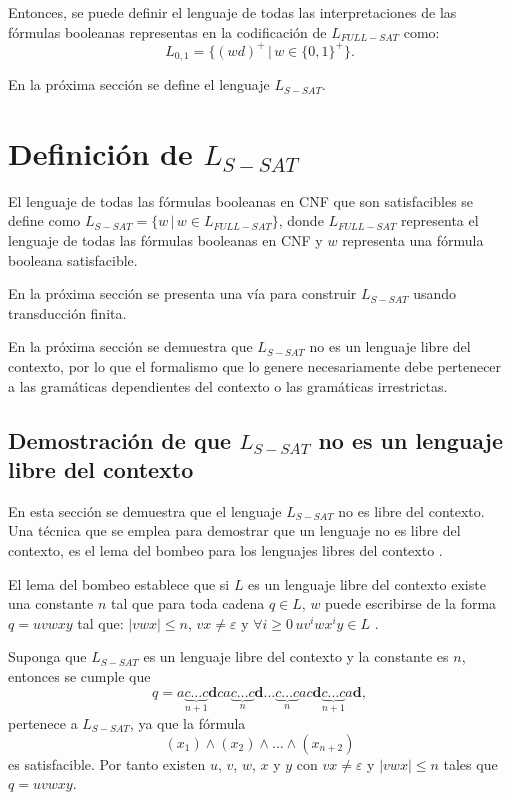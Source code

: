 Entonces, se puede definir el lenguaje de todas las interpretaciones de las fórmulas booleanas representas en la codificación
de $L_{FULL-SAT}$ como:
$$L_{0,1}=\{(wd)^+\,|\,w\in\{0,1\}^+\}.$$

En la próxima sección se define el lenguaje $L_{S-SAT}$.

\section{Definición de $L_{S-SAT}$}

El lenguaje de todas las fórmulas booleanas en CNF que son satisfacibles se define como $L_{S-SAT}=\{w\,|\,w \in L_{FULL-SAT} \}$,
donde $L_{FULL-SAT}$ representa el lenguaje de todas las fórmulas booleanas en CNF y $w$ representa una fórmula booleana satisfacible.

En la próxima sección se presenta una vía para construir $L_{S-SAT}$ usando transducción finita.

En la próxima sección se demuestra que $L_{S-SAT}$ no es un lenguaje libre del contexto, por lo que el formalismo que lo
genere necesariamente debe pertenecer a las gramáticas dependientes del contexto o las gramáticas irrestrictas.

\subsection{Demostración de que $L_{S-SAT}$ no es un lenguaje libre del contexto}

En esta sección se demuestra que el lenguaje $L_{S-SAT}$ no es libre del contexto. Una técnica que se emplea para demostrar que un lenguaje no es libre del contexto, es el lema del bombeo para los lenguajes
libres del contexto \cite{authomataTheory}.

El lema del bombeo establece que si $L$ es un lenguaje libre del contexto
existe una constante $n$ tal que para toda cadena $q\in L$, $w$ puede escribirse de la forma $q=uvwxy$ tal que:
$|vwx|\leq n$, $vx\neq \varepsilon$ y $\forall i\geq 0\,uv^iwx^iy\in L$ \cite{authomataTheory}.

Suponga que $L_{S-SAT}$ es un lenguaje libre del contexto y la constante es $n$, entonces se cumple que
$$q=a\underbrace{c\ldots c}_{n+1}\mathbf{d}ca\underbrace{c\ldots c}_{n}\mathbf{d}\ldots \underbrace{c\ldots c}_{n}ac\mathbf{d}\underbrace{c\ldots c}_{n+1}a\mathbf{d},$$
pertenece a $L_{S-SAT}$, ya que la fórmula
$$(x_1)\wedge(x_2)\wedge\ldots\wedge(x_{n+2})$$ es satisfacible. Por tanto existen $u$, $v$, $w$, $x$ y $y$ con $vx\neq \varepsilon$ y $|vwx|\leq n$
tales que $q=uvwxy$.

